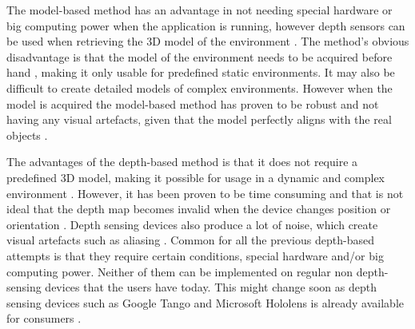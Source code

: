 The model-based method has an advantage in not needing special hardware or big computing power when the application is running, however depth sensors can be used when retrieving the 3D model of the environment \cite{tian2015handling}. The method's obvious disadvantage is that the model of the environment needs to be acquired before hand \cite{breen1996interactive, shah2012occlusion}, making it only usable for predefined static environments. It may also be difficult to create detailed models of complex environments. However when the model is acquired the model-based method has proven to be robust and not having any visual artefacts, given that the model perfectly aligns with the real objects \cite{breen1996interactive}.

The advantages of the depth-based method is that it does not require a predefined 3D model, making it possible for usage in a dynamic and complex environment \cite{breen1996interactive, shah2012occlusion}. However, it has been proven to be time consuming \cite{tian2015handling} and that is not ideal that the depth map becomes invalid when the device changes position or orientation \cite{breen1996interactive, shah2012occlusion}. Depth sensing devices also produce a lot of noise, which create visual artefacts such as aliasing \cite{wloka1995resolving, shah2012occlusion, zhu2010handling}. Common for all the previous depth-based attempts is that they require certain conditions, special hardware and/or big computing power. Neither of them can be implemented on regular non depth-sensing devices that the users have today. This might change soon as depth sensing devices such as Google Tango and Microsoft Hololens is already available for consumers \cite{vergeTango, vergeHololens}.

